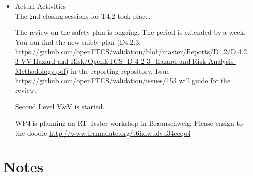 \documentclass[a4paper, 11pt]{article}
\begin{document}
\begin{itemize}
\item Actual Activities\\
The 2nd closing sessions for T4.2 took place.

The review on the safety plan is ongoing. The period is extended by a week. You can find the new safety plan (D4.2.3: \url{https://github.com/openETCS/validation/blob/master/Reports/D4.2/D.4.2.3-VV-Hazard-and-Risk/OpenETCS_D-4-2-3_Hazard-and-Risk-Analysis-Methodology.pdf}) in the reporting repository. Issue \url{https://github.com/openETCS/validation/issues/153} will guide for the review. 

Second Level V\&V is started.

WP4 is planning an RT-Tester workshop in Braunschweig: Please ensign to the doodle \url{http://www.framadate.org/t6hdwudvu34ecqo4}

\end{itemize}

\section{Notes}
\end{document}
